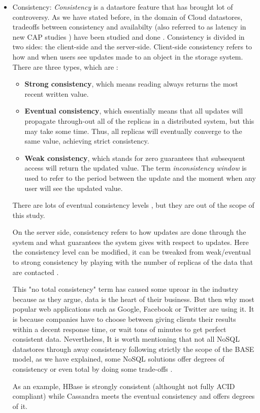 \begin{itemize}

\item Consistency:
\textit{Consistency} is a datastore feature that has brought lot of controversy. As we have stated before, in the domain of Cloud datastores, tradeoffs between consistency and availabilty (also referred to as latency in new CAP studies \cite{abadi2012consistency}) have been studied and done \cite{brewer2012cap} \cite{gilbert2012perspectives}. Consistency is divided in two sides: the client-side and the server-side. Client-side consistency refers to how and when users see updates made to an object in the storage system. There are three types, which are \cite{vogels2009eventually}:
\begin{itemize}
 \item \textbf{Strong consistency}, which means reading always returns the most recent written value.
\item \textbf{Eventual consistency}, which essentially means that all updates will propagate through-out all of the replicas in a distributed system, but this may take some time. Thus, all replicas will eventually converge to the same value, achieving strict consistency. 
\item \textbf{Weak consistency}, which stands for zero guarantees that subsequent access will return the updated value. The term \textit{inconsistency window} is used to refer to the period between the update and the moment when any user will see the updated value.
\end{itemize}

There are lots of eventual consistency levels \cite{wiki:consistency}, but they are out of the scope of this study.
\par
On the server side, consistency refers to how updates are done through the system and what guarantees the system gives with respect to updates. Here the consistency level can be modified, it can be tweaked from weak/eventual to strong consistency by playing with the number of replicas of the data that are contacted \cite{vogels2009eventually}.
\par
This "no total consistency" term has caused some uproar in the industry because as they argue, data is the heart of their business. But then why most popular web applications such as Google, Facebook or Twitter are using it. It is because companies have to choose between giving clients their results within a decent response time, or wait tons of minutes to get perfect consistent data. Nevertheless, It is worth mentioning that not all NoSQL datastores through away consistency following strictly the scope of the BASE model, as we have explained, some NoSQL solutions offer degrees of consistency or even total by doing some trade-offs \cite{chang2008bigtable} \cite{cooper2008pnuts} \cite{ApacheHBase}.
\par
As an example, HBase is strongly consistent (althought not fully ACID compliant) while Cassandra meets the eventual consistency and offers degrees of it.
\end{itemize}

